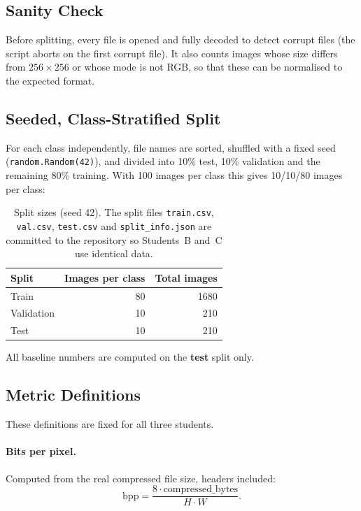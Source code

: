\documentclass[11pt]{article}
\begin{document}
\subsection{Sanity Check}
Before splitting, every file is opened and fully decoded to detect corrupt files (the script aborts on the first corrupt file). It also counts images whose size differs from $256\times256$ or whose mode is not RGB, so that these can be normalised to the expected format. 

\subsection{Seeded, Class-Stratified Split}
For each class independently, file names are sorted, shuffled with a fixed seed (\texttt{random.Random(42)}), and divided into 10\% test, 10\% validation and the remaining 80\% training. With 100 images per class this gives 10/10/80 images per class:
 
\begin{table}[h]
\centering
\caption{Split sizes (seed 42). The split files \texttt{train.csv}, \texttt{val.csv}, \texttt{test.csv} and \texttt{split\_info.json} are committed to the repository so Students~B and~C use identical data.}
\begin{tabular}{lrr}
\toprule
Split & Images per class & Total images \\
\midrule
Train & 80 & 1680 \\
Validation & 10 & 210 \\
Test & 10 & 210 \\
\bottomrule
\end{tabular}
\end{table}
 
All baseline numbers are computed on the \textbf{test} split only.
 
\subsection{Metric Definitions}

These definitions are fixed for all three students.
 
\paragraph{Bits per pixel.} Computed from the real compressed file size, headers included:
\begin{equation}
  \mathrm{bpp} = \frac{8 \cdot \text{compressed\_bytes}}{H \cdot W}.
\end{equation}
 
\end{document}
